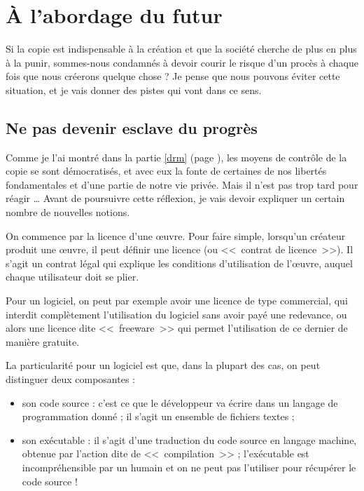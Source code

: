 \chapter{À l'abordage du futur}

Si la copie est indispensable à la création et que la société cherche de plus en plus à la punir, sommes-nous condamnés à devoir courir le risque d'un procès à chaque fois que nous créerons quelque chose ?
Je pense que nous pouvons éviter cette situation, et je vais donner des pistes qui vont dans ce sens.

\section{Ne pas devenir esclave du progrès}

Comme je l'ai montré dans la partie \ref*{drm} (page \pageref{drm}), les moyens de contrôle de la copie se sont démocratisés, et avec eux la fonte de certaines de nos libertés fondamentales et d'une partie de notre vie privée.
Mais il n'est pas trop tard pour réagir \dots{}
Avant de poursuivre cette réflexion, je vais devoir expliquer un certain nombre de nouvelles notions.

On commence par la licence d'une œuvre.
Pour faire simple, lorsqu'un créateur produit une œuvre, il peut définir une licence (ou <<~contrat de licence~>>).
Il s'agit un contrat légal qui explique les conditions d'utilisation de l'œuvre, auquel chaque utilisateur doit se plier.

Pour un logiciel, on peut par exemple avoir une licence de type commercial, qui interdit complètement l'utilisation du logiciel sans avoir payé une redevance, ou alors une licence dite <<~freeware~>> qui permet l'utilisation de ce dernier de manière gratuite.

La particularité pour un logiciel est que, dans la plupart des cas, on peut distinguer deux composantes :

\begin{itemize}
\item son code source : c'est ce que le développeur va écrire dans un langage de programmation donné ; il s'agit un ensemble de fichiers textes ;
\item son exécutable : il s'agit d'une traduction du code source en langage machine, obtenue par l'action dite de <<~compilation~>> ; l'exécutable est incompréhensible par un humain et on ne peut pas l'utiliser pour récupérer le code source !
\end{itemize}

